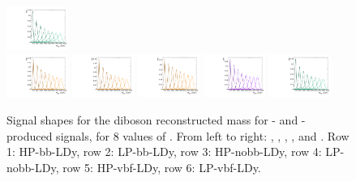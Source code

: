 \begin{figure}[htbp]
  \includegraphics[width=0.18\textwidth]{fig/analysis/templateSignalVsMX_fromDC_WprToWH_MVV_mu_HP_vbf_DEtaLo.pdf}\\
  \includegraphics[width=0.18\textwidth]{fig/analysis/templateSignalVsMX_fromDC_GbuToWW_MVV_mu_LP_vbf_DEtaLo.pdf}
  \includegraphics[width=0.18\textwidth]{fig/analysis/templateSignalVsMX_fromDC_RadToWW_MVV_mu_LP_vbf_DEtaLo.pdf}
  \includegraphics[width=0.18\textwidth]{fig/analysis/templateSignalVsMX_fromDC_ZprToWW_MVV_mu_LP_vbf_DEtaLo.pdf}
  \includegraphics[width=0.18\textwidth]{fig/analysis/templateSignalVsMX_fromDC_WprToWZ_MVV_mu_LP_vbf_DEtaLo.pdf}
  \includegraphics[width=0.18\textwidth]{fig/analysis/templateSignalVsMX_fromDC_WprToWH_MVV_mu_LP_vbf_DEtaLo.pdf}\\
  \caption{
    Signal shapes for the diboson reconstructed mass \MVV for \ggF- and \DY-produced signals, for 8 values of \MX.
    From left to right: \GBulktoWW, \RadtoWW, \ZprtoWW, \WprtoWZ, and \WprtoWH.
    Row 1: HP-bb-LDy, row 2: LP-bb-LDy, row 3: HP-nobb-LDy, row 4: LP-nobb-LDy, row 5: HP-vbf-LDy, row 6: LP-vbf-LDy.
  }
  \label{fig:MVVShapes_NonVBF_LDy_Run2}
\end{figure}

